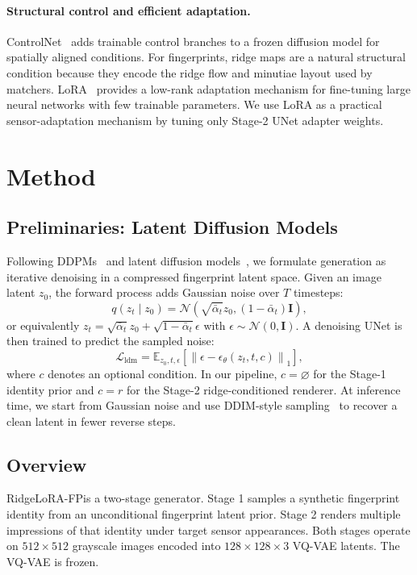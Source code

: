 \documentclass{article}
\newcommand{\method}{RidgeLoRA-FP}
\begin{document}
\paragraph{Structural control and efficient adaptation.}
ControlNet~\cite{zhang2023controlnet} adds trainable control branches to a
frozen diffusion model for spatially aligned conditions.  For fingerprints,
ridge maps are a natural structural condition because they encode the ridge
flow and minutiae layout used by matchers.  LoRA~\cite{hu2022lora} provides a
low-rank adaptation mechanism for fine-tuning large neural networks with few
trainable parameters.  We use LoRA as a practical sensor-adaptation mechanism
by tuning only Stage-2 UNet adapter weights.

\section{Method}
\label{sec:method}

\subsection{Preliminaries: Latent Diffusion Models}

Following DDPMs~\cite{ho2020ddpm} and latent diffusion
models~\cite{rombach2022ldm}, we formulate generation as iterative denoising
in a compressed fingerprint latent space.  Given an image latent $z_0$, the
forward process adds Gaussian noise over $T$ timesteps:
\[
    q(z_t \mid z_0) =
    \mathcal{N}\left(
        \sqrt{\bar{\alpha}_t} z_0,
        (1-\bar{\alpha}_t)\mathbf{I}
    \right),
\]
or equivalently
$z_t=\sqrt{\bar{\alpha}_t}z_0+\sqrt{1-\bar{\alpha}_t}\epsilon$ with
$\epsilon \sim \mathcal{N}(0,\mathbf{I})$.  A denoising UNet is then trained to
predict the sampled noise:
\[
    \mathcal{L}_{\text{ldm}} =
    \mathbb{E}_{z_0,t,\epsilon}
    \left[\left\|
        \epsilon - \epsilon_\theta(z_t,t,c)
    \right\|_1\right],
\]
where $c$ denotes an optional condition.  In our pipeline, $c=\varnothing$ for
the Stage-1 identity prior and $c=r$ for the Stage-2 ridge-conditioned
renderer.  At inference time, we start from Gaussian noise and use DDIM-style
sampling~\cite{song2020ddim} to recover a clean latent in fewer reverse steps.
\subsection{Overview}

\method is a two-stage generator.  Stage 1 samples a synthetic fingerprint
identity from an unconditional fingerprint latent prior.  Stage 2 renders
multiple impressions of that identity under target sensor appearances.  Both
stages operate on $512 \times 512$ grayscale images encoded into
$128 \times 128 \times 3$ VQ-VAE latents.  The VQ-VAE is frozen.
\end{document}
